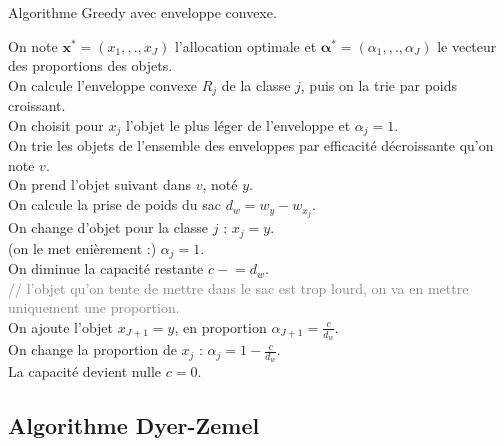 \documentclass{article}
\newcommand{\minuseq}{\mathrel{-}=}
\newcommand\comm[1]{\footnotesize\ttfamily\textcolor{gray}{// #1}}
\begin{document}
\begin{algorithm}[!ht]
\caption{Algorithme Greedy avec enveloppe convexe.}
\label{alg:greedy-convexe}
\small
{}
	On note $\mathbf{x}^{*} = (x_1, ,., x_{J})$ l'allocation optimale et $\mathbf{\alpha}^{*} = (\alpha_1, ,., \alpha_{J})$ le vecteur des proportions des objets.\\
	{
	    On calcule l'enveloppe convexe $R_j$ de la classe $j$, puis on la trie par poids croissant.\\
	    On choisit pour $x_j$ l'objet le plus léger de l'enveloppe et $\alpha_j=1$.\\
	}
	On trie les objets de l'ensemble des enveloppes par efficacité décroissante qu'on note $v$.\\
	{
	    On prend l'objet suivant dans $v$, noté $y$.\\
	    {
		    {
		        On calcule la prise de poids du sac $d_w = w_y-w_{x_j}$.\\
		        {
		            On change d'objet pour la classe $j$ : $x_j = y$.\\
		            (on le met enièrement :) $\alpha_j = 1$.\\
		            On diminue la capacité restante $c \minuseq d_w$.\\
		            
		        }
		        {
		            \comm{l'objet qu'on tente de mettre dans le sac est trop lourd, on va en mettre uniquement une proportion.}\\
		            On ajoute l'objet $x_{J+1} = y$, en proportion
		            $\alpha_{J+1} = \frac{c}{d_w}$.\\
                    On change la proportion de $x_j$ : $\alpha_j = 1-\frac{c}{d_w}$.\\
                    La capacité devient nulle $c = 0$.
		        }
		    }
	    }
	}
\end{algorithm}

\newpage
\subsection{Algorithme Dyer-Zemel}
\end{document}
